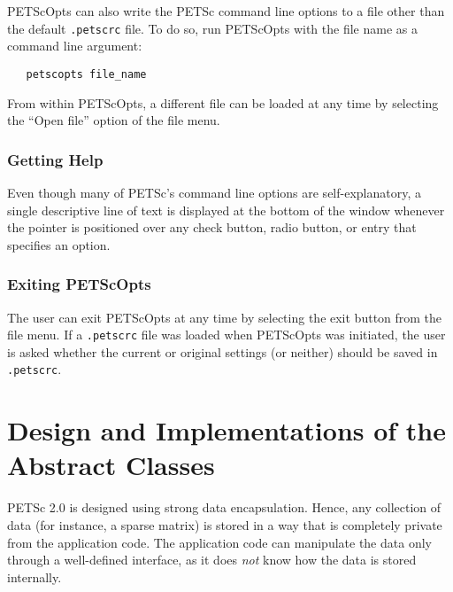 PETScOpts can also write the PETSc command line options to a file
other than the default {\tt .petscrc} file. To do so, run PETScOpts
with the file name as a command line argument:
\begin{verbatim}
   petscopts file_name
\end{verbatim}
From within PETScOpts, a different file can be loaded at any time
by selecting the ``Open file'' option of the file menu.

\subsection{Getting Help}

Even though many of PETSc's command line options are self-explanatory,
a single descriptive line of text is displayed at the bottom of the
window whenever the pointer is positioned over any check button, radio
button, or entry that specifies an option.

\subsection{Exiting PETScOpts}

The user can exit PETScOpts at any time by selecting the exit
button from the file menu.  If a {\tt .petscrc} file was loaded when
PETScOpts was initiated, the user is asked whether the current or
original settings (or neither) should be saved in {\tt .petscrc}.


\chapter{Design and Implementations of the  Abstract Classes}
\label{chapter:design}

PETSc 2.0 is designed using strong data encapsulation.  Hence,
any collection of data (for instance, a sparse matrix) is stored in 
a way that is completely private from the application code. The application 
code can manipulate the data only through a well-defined interface, as it 
does {\em not} know how the data is stored internally. 


